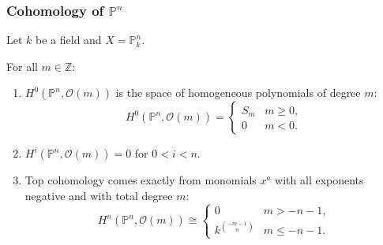 \documentclass[12pt]{article}
\begin{document}
\subsubsection{Cohomology of $\mathbb{P}^n$}
Let $k$ be a field and $X=\mathbb{P}^n_k$.
\begin{theorem}
    For all $m\in \mathbb Z$:
    \begin{enumerate}
        \item $H^0(\mathbb P^n,\mathcal O(m))$ is the space of homogeneous polynomials of degree $m$:
              \[
                  H^0(\mathbb P^n,\mathcal O(m)) =
                  \begin{cases}
                      S_m & m \ge 0, \\
                      0   & m<0.
                  \end{cases}
              \]

        \item $H^i(\mathbb P^n,\mathcal O(m))=0$ for $0<i<n$.

        \item Top cohomology comes exactly from monomials $x^a$ with all exponents negative and with total degree $m$:
              \[
                  H^n(\mathbb P^n,\mathcal O(m)) \cong
                  \begin{cases}
                      0                   & m>-n-1,    \\
                      k^{\binom{-m-1}{n}} & m\le -n-1.
                  \end{cases}
              \]
    \end{enumerate}
\end{theorem}
\end{document}
